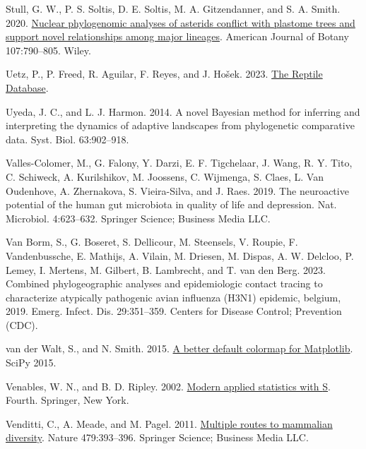 \documentclass[fleqn,10pt,lineno]{wlpeerj} %
\newlength{\cslhangindent}
\newlength{\cslentryspacingunit} %
\newenvironment{CSLReferences}[2] %
 {%
  \setlength{\parindent}{0pt}
  \ifodd #1
  \let\oldpar\par
  \def\par{\hangindent=\cslhangindent\oldpar}
  \fi
  \setlength{\parskip}{#2\cslentryspacingunit}
 }%
 {}
\begin{document}
\begin{CSLReferences}{1}{0}
\leavevmode{}%
Stull, G. W., P. S. Soltis, D. E. Soltis, M. A. Gitzendanner, and S. A. Smith. 2020. \href{https://doi.org/10.1002/ajb2.1468}{Nuclear phylogenomic analyses of asterids conflict with plastome trees and support novel relationships among major lineages}. American Journal of Botany 107:790--805. Wiley.

\leavevmode{}%
Uetz, P., P. Freed, R. Aguilar, F. Reyes, and J. Hošek. 2023. \href{http://www.reptile-database.org}{The {R}eptile {D}atabase}.

\leavevmode{}%
Uyeda, J. C., and L. J. Harmon. 2014. A novel {B}ayesian method for inferring and interpreting the dynamics of adaptive landscapes from phylogenetic comparative data. Syst. Biol. 63:902--918.

\leavevmode{}%
Valles-Colomer, M., G. Falony, Y. Darzi, E. F. Tigchelaar, J. Wang, R. Y. Tito, C. Schiweck, A. Kurilshikov, M. Joossens, C. Wijmenga, S. Claes, L. Van Oudenhove, A. Zhernakova, S. Vieira-Silva, and J. Raes. 2019. The neuroactive potential of the human gut microbiota in quality of life and depression. Nat. Microbiol. 4:623--632. Springer Science; Business Media LLC.

\leavevmode{}%
Van Borm, S., G. Boseret, S. Dellicour, M. Steensels, V. Roupie, F. Vandenbussche, E. Mathijs, A. Vilain, M. Driesen, M. Dispas, A. W. Delcloo, P. Lemey, I. Mertens, M. Gilbert, B. Lambrecht, and T. van den Berg. 2023. Combined phylogeographic analyses and epidemiologic contact tracing to characterize atypically pathogenic avian influenza ({H3N1}) epidemic, belgium, 2019. Emerg. Infect. Dis. 29:351--359. Centers for Disease Control; Prevention (CDC).

\leavevmode{}%
van der Walt, S., and N. Smith. 2015. \href{https://youtu.be/xAoljeRJ3lU}{A better default colormap for {Matplotlib}}. SciPy 2015.

\leavevmode{}%
Venables, W. N., and B. D. Ripley. 2002. \href{https://www.stats.ox.ac.uk/pub/MASS4/}{Modern applied statistics with {S}}. Fourth. Springer, New York.

\leavevmode{}%
Venditti, C., A. Meade, and M. Pagel. 2011. \href{https://doi.org/10.1038/nature10516}{Multiple routes to mammalian diversity}. Nature 479:393--396. Springer Science; Business Media {LLC}.


\end{CSLReferences}
\end{document}
